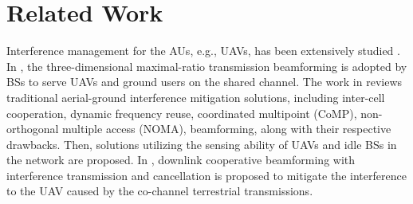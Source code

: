 \section{Related Work}
\label{secRelatedWork}
Interference management for the AUs, e.g., UAVs, has been extensively studied \cite{zeng2018cellular, mei2021aerial, mei2019cooperative}.
In \cite{zeng2018cellular}, the three-dimensional maximal-ratio transmission beamforming is adopted by BSs to serve UAVs and ground users on the shared channel.
The work in \cite{mei2021aerial} reviews traditional aerial-ground interference mitigation solutions, including inter-cell cooperation, dynamic frequency reuse, coordinated multipoint (CoMP), non-orthogonal multiple access (NOMA), beamforming, along with their respective drawbacks.
Then, solutions utilizing the sensing ability of UAVs and idle BSs in the network are proposed.
In \cite{mei2019cooperative}, downlink cooperative beamforming with interference transmission and cancellation is proposed to mitigate the interference to the UAV caused by the co-channel terrestrial transmissions.


